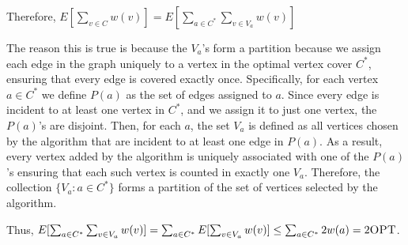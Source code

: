 \documentclass[12pt, letterpaper]{article}
\begin{document}
\begin{problemproof}
    Therefore, $E[\sum_{v \in C}w(v)]=E[\sum_{a \in C^*} \sum_{v \in V_a}w(v)]$

    The reason this is true is because the $V_a$'s form a partition because we assign each edge in the graph uniquely to a vertex in the optimal vertex cover \(C^*\), ensuring that every edge is covered exactly once. Specifically, for each vertex \(a \in C^*\) we define \(P(a)\) as the set of edges assigned to \(a\). Since every edge is incident to at least one vertex in \(C^*\), and we assign it to just one vertex, the \(P(a)\)'s are disjoint. Then, for each \(a\), the set \(V_a\) is defined as all vertices chosen by the algorithm that are incident to at least one edge in \(P(a)\). As a result, every vertex added by the algorithm is uniquely associated with one of the \(P(a)\)'s ensuring that each such vertex is counted in exactly one \(V_a\). Therefore, the collection \(\{V_a : a \in C^*\}\) forms a partition of the set of vertices selected by the algorithm.

    Thus, $E[\sum_{a \in C^*} \sum_{v \in V_a}w(v)]=\sum_{a \in C^*}E[\sum_{v \in V_a}w(v)] \leq \sum_{a \in C^*}2w(a) = 2 \textsc{OPT}$.
\end{problemproof}
\end{document}
